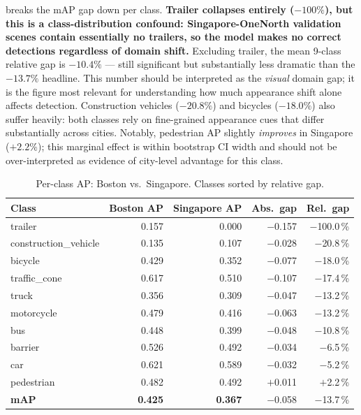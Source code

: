\documentclass[letterpaper, 10pt, journal]{IEEEtran}
\begin{document}
 breaks the mAP gap down per class.
\textbf{Trailer collapses entirely ($-100\%$), but this is a class-distribution
confound: Singapore-OneNorth validation scenes contain essentially no trailers,
so the model makes no correct detections regardless of domain shift.}
Excluding trailer, the mean 9-class relative gap is $-10.4\%$ --- still significant
but substantially less dramatic than the $-13.7\%$ headline.
This number should be interpreted as the \emph{visual} domain gap; it is the figure
most relevant for understanding how much appearance shift alone affects detection.
Construction vehicles ($-20.8\%$) and bicycles ($-18.0\%$) also suffer heavily:
both classes rely on fine-grained appearance cues that differ substantially across
cities.
Notably, pedestrian AP slightly \emph{improves} in Singapore ($+2.2\%$);
this marginal effect is within bootstrap CI width and should not be
over-interpreted as evidence of city-level advantage for this class.

\begin{table}[h]
\centering
\caption{Per-class AP: Boston vs.\ Singapore. Classes sorted by relative gap.}
\label{tab:perclass}
\setlength{\tabcolsep}{4pt}
\begin{tabular}{@{}lrrrr@{}}
\toprule
Class & Boston AP & Singapore AP & Abs.\ gap & Rel.\ gap \\
\midrule
trailer                & 0.157 & 0.000 & $-$0.157 & $-$100.0\,\% \\
construction\_vehicle  & 0.135 & 0.107 & $-$0.028 &  $-$20.8\,\% \\
bicycle                & 0.429 & 0.352 & $-$0.077 &  $-$18.0\,\% \\
traffic\_cone          & 0.617 & 0.510 & $-$0.107 &  $-$17.4\,\% \\
truck                  & 0.356 & 0.309 & $-$0.047 &  $-$13.2\,\% \\
motorcycle             & 0.479 & 0.416 & $-$0.063 &  $-$13.2\,\% \\
bus                    & 0.448 & 0.399 & $-$0.048 &  $-$10.8\,\% \\
barrier                & 0.526 & 0.492 & $-$0.034 &   $-$6.5\,\% \\
car                    & 0.621 & 0.589 & $-$0.032 &   $-$5.2\,\% \\
pedestrian             & 0.482 & 0.492 & $+$0.011 &   $+$2.2\,\% \\
\midrule
\textbf{mAP}           & \textbf{0.425} & \textbf{0.367} & $-$0.058 & $-$13.7\,\% \\
\bottomrule
\end{tabular}
\end{table}
\end{document}
